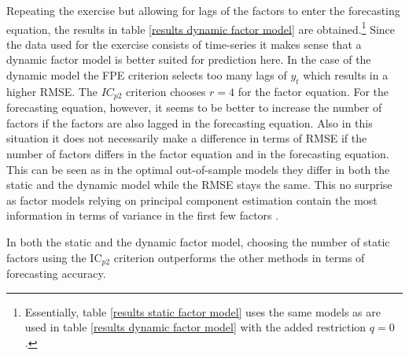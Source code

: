 \documentclass[11pt]{article}
\begin{document}
Repeating the exercise but allowing for lags of the factors to enter the forecasting equation, the results in table \ref{results dynamic factor model} are obtained.\footnote{Essentially, table \ref{results static factor model} uses the same models as are used in table \ref{results dynamic factor model} with the added restriction $q=0$.} Since the data used for the exercise consists of time-series it makes sense that a dynamic factor model is better suited for prediction here. In the case of the dynamic model the FPE criterion selects too many lags of $y_t$ which results in a higher RMSE. The $IC_{p2}$ criterion chooses $r=4$ for the factor equation. For the forecasting equation, however, it seems to be better to increase the number of factors if the factors are also lagged in the forecasting equation. Also in this situation it does not necessarily make a difference in terms of RMSE if the number of factors differs in the factor equation and in the forecasting equation. This can be seen as in the optimal out-of-sample models they differ in both the static and the dynamic model while the RMSE stays the same. This no surprise as factor models relying on principal component estimation contain the most information in terms of variance in the first few factors .

In both the static and the dynamic factor model, choosing the number of static factors using the IC$_{p2}$ criterion outperforms the other methods in terms of forecasting accuracy.
\end{document}
